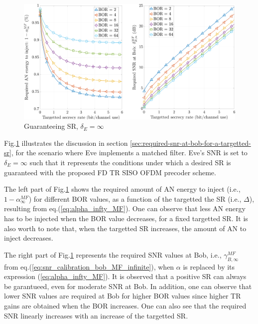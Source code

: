 \documentclass[journal,comsoc]{IEEEtran}
\let\MYoriglatexcaption\caption
\renewcommand{\caption}[2][\relax]{\MYoriglatexcaption[#2]{#2}}
\begin{document}
\begin{figure}[h!t]
	\centering
	\captionsetup{justification=centering}
	\includegraphics[width=1\linewidth]{graphs/SR_guarantee.pdf}
	\caption{Guaranteeing SR, $\delta_E = \infty$}
	\label{fig_targettedSR}
\end{figure} 
Fig.\ref{fig_targettedSR} illustrates the discussion in section \ref{sec:required-snr-at-bob-for-a-targetted-sr}, for the scenario where Eve implements a matched filter. Eve's SNR is set to $\delta_E = \infty$ such that it represents the conditions under which a desired SR is guaranteed with the proposed FD TR SISO OFDM precoder scheme.

The left part of Fig.\ref{fig_targettedSR} shows the required amount of AN energy to inject (i.e., $1-\alpha_{\infty}^{MF}$) for different BOR values, as a function of the targetted the SR (i.e., $\Delta$), resulting from eq.(\ref{eq:alpha_infty_MF}). One can observe that less AN energy has to be injected when the BOR value decreases, for a fixed targetted SR. It is also worth to note that, when the targetted SR increases, the amount of AN to inject decreases. 

The right part of Fig.\ref{fig_targettedSR} represents the required SNR values at Bob, i.e., $\gamma_{B,\infty}^{MF}$ from eq.(\ref{eq:snr_calibration_bob_MF_infinite}), when $\alpha$ is replaced by its expression (\ref{eq:alpha_infty_MF}). It is observed that a positive SR can always be garantueed, even for moderate SNR at Bob. In addition, one can observe that lower SNR values are required at Bob for higher BOR values since higher TR gains are obtained when the BOR increases. One can also see that the required SNR linearly increases with an increase of the targetted SR. 
\end{document}
